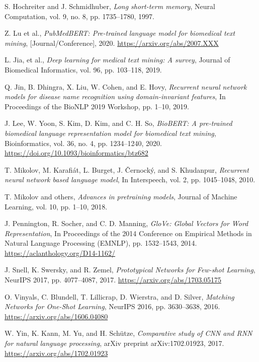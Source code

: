 \documentclass[12pt]{report}
\begin{document}
\begin{thebibliography}{99}
S. Hochreiter and J. Schmidhuber, 
\textit{Long short-term memory}, 
Neural Computation, vol. 9, no. 8, pp. 1735–1780, 1997.

Z. Lu et al., 
\textit{PubMedBERT: Pre-trained language model for biomedical text mining}, 
[Journal/Conference], 2020. 
\url{https://arxiv.org/abs/2007.XXX}

L. Jia, et al., 
\textit{Deep learning for medical text mining: A survey}, 
Journal of Biomedical Informatics, vol. 96, pp. 103–118, 2019.

Q. Jin, B. Dhingra, X. Liu, W. Cohen, and E. Hovy, 
\textit{Recurrent neural network models for disease name recognition using domain-invariant features}, 
In Proceedings of the BioNLP 2019 Workshop, pp. 1–10, 2019.

J. Lee, W. Yoon, S. Kim, D. Kim, and C. H. So, 
\textit{BioBERT: A pre-trained biomedical language representation model for biomedical text mining}, 
Bioinformatics, vol. 36, no. 4, pp. 1234–1240, 2020. 
\url{https://doi.org/10.1093/bioinformatics/btz682}

T. Mikolov, M. Karafiát, L. Burget, J. Černocký, and S. Khudanpur, 
\textit{Recurrent neural network based language model}, 
In Interspeech, vol. 2, pp. 1045–1048, 2010.

T. Mikolov and others, 
\textit{Advances in pretraining models}, 
Journal of Machine Learning, vol. 10, pp. 1–10, 2018.

J. Pennington, R. Socher, and C. D. Manning, 
\textit{GloVe: Global Vectors for Word Representation}, 
In Proceedings of the 2014 Conference on Empirical Methods in Natural Language Processing (EMNLP), pp. 1532–1543, 2014. 
\url{https://aclanthology.org/D14-1162/}

J. Snell, K. Swersky, and R. Zemel, 
\textit{Prototypical Networks for Few-shot Learning}, 
NeurIPS 2017, pp. 4077–4087, 2017. 
\url{https://arxiv.org/abs/1703.05175}

O. Vinyals, C. Blundell, T. Lillicrap, D. Wierstra, and D. Silver, 
\textit{Matching Networks for One-Shot Learning}, 
NeurIPS 2016, pp. 3630–3638, 2016. 
\url{https://arxiv.org/abs/1606.04080}

W. Yin, K. Kann, M. Yu, and H. Schütze, 
\textit{Comparative study of CNN and RNN for natural language processing}, 
arXiv preprint arXiv:1702.01923, 2017. 
\url{https://arxiv.org/abs/1702.01923}


\end{thebibliography}
\end{document}
